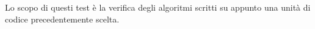 Lo scopo di questi test è la verifica degli algoritmi scritti su appunto una unità di codice precedentemente scelta.